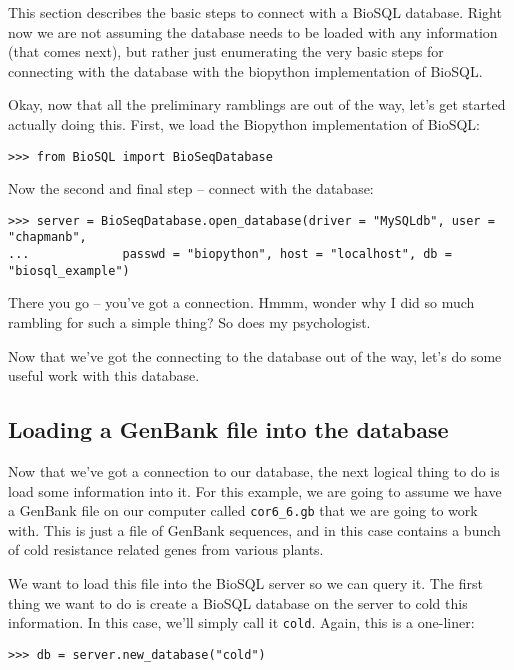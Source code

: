 \documentclass{article}
\begin{document}
This section describes the basic steps to connect with a BioSQL
database. Right now we are not assuming the database needs to be loaded
with any information (that comes next), but rather just enumerating the 
very basic steps for connecting with the database with the biopython
implementation of BioSQL.


Okay, now that all the preliminary ramblings are out of the way, let's
get started actually doing this. First, we load the Biopython
implementation of BioSQL:

\begin{verbatim}
>>> from BioSQL import BioSeqDatabase
\end{verbatim}

Now the second and final step -- connect with the database:

\begin{verbatim}
>>> server = BioSeqDatabase.open_database(driver = "MySQLdb", user = "chapmanb",
...             passwd = "biopython", host = "localhost", db = "biosql_example")
\end{verbatim}

There you go -- you've got a connection. Hmmm, wonder why I did so much
rambling for such a simple thing? So does my psychologist.


Now that we've got the connecting to the database out of the way, let's
do some useful work with this database.

\subsection{Loading a GenBank file into the database}

Now that we've got a connection to our database, the next logical thing
to do is load some information into it. For this example, we are going
to assume we have a GenBank file on our computer called
\verb|cor6_6.gb| that we are going to work with. This is just a file of
GenBank sequences, and in this case contains a bunch of cold resistance
related genes from various plants. 


We want to load this file into the BioSQL server so we can query it.
The first thing we want to do is create a BioSQL database on the server
to cold this information. In this case, we'll simply call it
\verb|cold|. Again, this is a one-liner:

\begin{verbatim}
>>> db = server.new_database("cold")
\end{verbatim}
\end{document}
